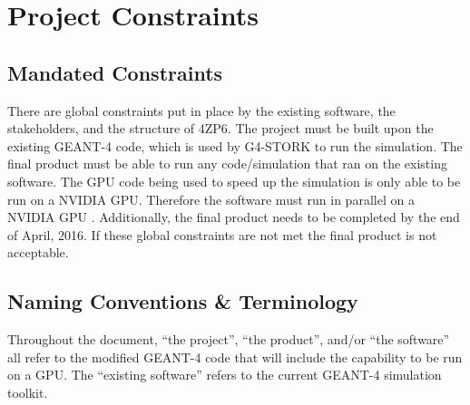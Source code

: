 \documentclass[12pt]{article}
\newcommand{\todo}[1]{\textcolor{red}{[TODO: #1]}} \else
\newcommand{\authornote}[3]{} \newcommand{\todo}[1]{} \fi
\newcommand{\ds}[1]{\authornote{blue}{DS}{#1}} %
\newcommand{\mmp}[1]{\authornote{green}{MP}{#1}}
\begin{document}
\section{Project Constraints}

\subsection{Mandated Constraints} %
There are global constraints put in place by the existing software, the stakeholders, and the structure of 4ZP6. The project must be built upon the existing GEANT-4 code, which is used by G4-STORK to run the simulation. The final product must be able to run any code/simulation that ran on the existing software. The GPU code being used to speed up the simulation is only able to be run on a NVIDIA GPU. Therefore the software must run in parallel on a NVIDIA GPU . Additionally, the final product needs to be completed by the end of April, 2016. If these global constraints are not met the final product is not acceptable.\\



\ds{Why an NVIDIA GPU? Was that constrained by your client?}\mmp{Added an explanation for why we are constrained to using an NVIDIA GPU}
\subsection{Naming Conventions \& Terminology} %
Throughout the document, ``the project'', ``the product'', and/or ``the software'' all refer to the modified GEANT-4 code that will include the capability to be run on a GPU. The ``existing software'' refers to the current GEANT-4 simulation toolkit.\\

\newpage %
\end{document}
